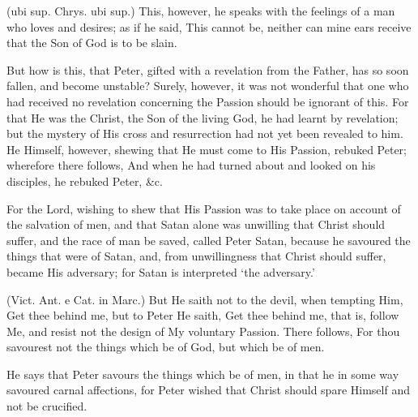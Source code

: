  (ubi sup. Chrys. ubi sup.) This, however, he speaks with the feelings of a man who loves and desires; as if he said, This cannot be, neither can mine ears receive that the Son of God is to be slain.

 But how is this, that Peter, gifted with a revelation from the Father, has so soon fallen, and become unstable? Surely, however, it was not wonderful that one who had received no revelation concerning the Passion should be ignorant of this. For that He was the Christ, the Son of the living God, he had learnt by revelation; but the mystery of His cross and resurrection had not yet been revealed to him. He Himself, however, shewing that He must come to His Passion, rebuked Peter; wherefore there follows, And when he had turned about and looked on his disciples, he rebuked Peter, \&c.

 For the Lord, wishing to shew that His Passion was to take place on account of the salvation of men, and that Satan alone was unwilling that Christ should suffer, and the race of man be saved, called Peter Satan, because he savoured the things that were of Satan, and, from unwillingness that Christ should suffer, became His adversary; for Satan is interpreted ‘the adversary.’

 (Vict. Ant. e Cat. in Marc.) But He saith not to the devil, when tempting Him, Get thee behind me, but to Peter He saith, Get thee behind me, that is, follow Me, and resist not the design of My voluntary Passion. There follows, For thou savourest not the things which be of God, but which be of men.

 He says that Peter savours the things which be of men, in that he in some way savoured carnal affections, for Peter wished that Christ should spare Himself and not be crucified.

 

